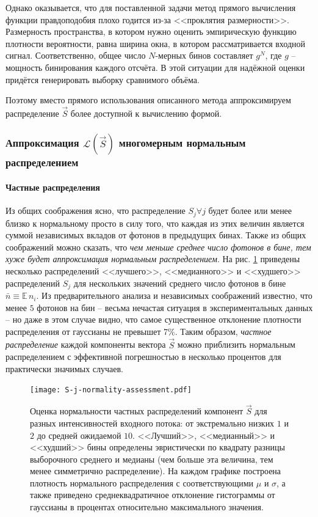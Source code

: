 \documentclass[12pt]{book}
\begin{document}
	Однако оказывается, что для поставленной задачи метод прямого вычисления функции правдоподобия плохо годится из-за <<проклятия размерности>>. Размерность пространства, в котором нужно оценить эмпирическую функцию плотности вероятности, равна ширина окна, в котором рассматривается входной сигнал. Соответственно, общее число $N$-мерных бинов составляет $g^{N}$, где $g$ -- мощность бинирования каждого отсчёта. В этой ситуации для надёжной оценки придётся генерировать выборку сравнимого объёма.
	
	Поэтому вместо прямого использования описанного метода аппроксимируем распределение $\vec{S}$ более доступной к вычислению формой.

	\subsubsection{Аппроксимация $\mathcal{L}(\vec{S})$ многомерным нормальным распределением}
	
	\label{sec:likelihood-as-multivar-normal}
	
	\paragraph{Частные распределения}

	Из общих соображения ясно, что распределение $S_j \forall j$ будет более или менее близко к нормальному просто в силу того, что каждая из этих величин является суммой независимых вкладов от фотонов в предыдущих бинах. Также из общих соображений можно сказать, что \textit{чем меньше среднее число фотонов в бине, тем хуже будет аппроксимация нормальным распределением}. На рис. \ref{pic:s-j-norm-assess} приведены несколько распределений <<лучшего>>, <<медианного>> и <<худшего>> распределений $S_j$ для нескольких значений среднего число фотонов в бине $\bar{n} \equiv \mathbb{E} \, n_i$. Из предварительного анализа и независимых соображений известно, что менее $5$ фотонов на бин -- весьма нечастая ситуация в экспериментальных данных -- но даже в этом случае видно, что самое существенное отклонение плотности распределения от гауссианы не превышет 7\%. Таким образом, \textit{частное распределение} каждой компоненты вектора $\vec{S}$ можно приблизить нормальным распределением с эффективной погрешностью в несколько процентов для практически значимых случаев.
	
	\begin{figure}[H]
		\centering
		\texttt{[image: S-j-normality-assessment.pdf]}
		\caption{Оценка нормальности частных распределений компонент $\vec{S}$ для разных интенсивностей входного потока: от экстремально низких $1$ и $2$ до средней ожидаемой $10$. <<Лучший>>, <<медианный>> и <<худший>> бины определены эвристически по квадрату разницы выборочного среднего и медианы (чем больше эта величина, тем менее симметрично распределение). На каждом графике построена плотность нормального распределения с соответствующими $\mu$ и $\sigma$, а также приведено среднеквадратичное отклонение гистограммы от гауссианы в процентах относительно максимального значения.}
		\label{pic:s-j-norm-assess}
	\end{figure}
\end{document}
